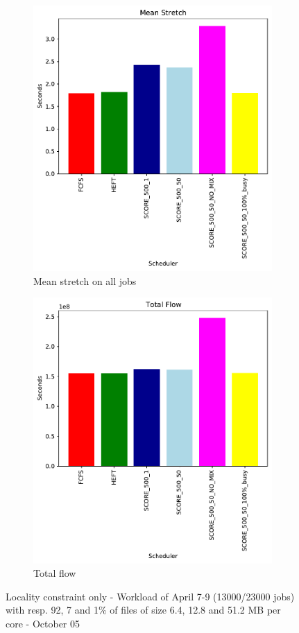 \documentclass[a4paper]{article}
\begin{document}
\begin{figure}[H]
\begin{subfigure}[b]{0.4\linewidth}\centering\includegraphics[width=0.9\linewidth]{MBSS/plot/Results_FCFS_Score_Adaptative_Multiplier_2022-04-07->2022-04-09_V9271_Mean_Stretch_450_128_32_256_4_1024.pdf}\caption{Mean stretch on all jobs}\end{subfigure}
\begin{subfigure}[b]{0.4\linewidth}\centering\includegraphics[width=0.9\linewidth]{MBSS/plot/Results_FCFS_Score_Adaptative_Multiplier_2022-04-07->2022-04-09_V9271_Total_flow_450_128_32_256_4_1024.pdf}\caption{Total flow}\end{subfigure}
\caption{Locality constraint only - Workload of April 7-9 (13000/23000 jobs) with resp. 92, 7 and 1\% of files of size 6.4, 12.8 and 51.2 MB per core - October 05}\end{figure}
\end{document}
